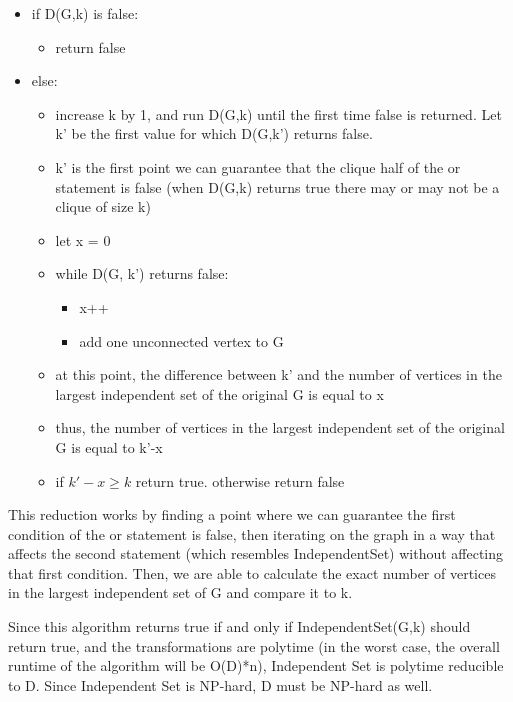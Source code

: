 \documentclass[a4paper]{article}
\begin{document}
\begin{itemize}
    \item if D(G,k) is false:
    \begin{itemize}
        \item return false
    \end{itemize}
    
    \item else:
    \begin{itemize}
        \item increase k by 1, and run D(G,k) until the first time false is returned. Let k' be the first value for which D(G,k') returns false.
        \item k' is the first point we can guarantee that the clique half of the or statement is false (when D(G,k) returns true there may or may not be a clique of size k)
        \item let x = 0
        \item while D(G, k') returns false:
        \begin{itemize}
            \item x++
            \item add one unconnected vertex to G
        \end{itemize}
        \item at this point, the difference between k' and the number of vertices in the largest independent set of the original G is equal to x
        \item thus, the number of vertices in the largest independent set of the original G is equal to k'-x
        \item if $k'-x\geq k$ return true. otherwise return false
    \end{itemize}
\end{itemize}

This reduction works by finding a point where we can guarantee the first condition of the or statement is false, then iterating on the graph in a way that affects the second statement (which resembles IndependentSet) without affecting that first condition. Then, we are able to calculate the exact number of vertices in the largest independent set of G and compare it to k.

Since this algorithm returns true if and only if IndependentSet(G,k) should return true, and the transformations are polytime (in the worst case, the overall runtime of the algorithm will be O(D)*n), Independent Set is polytime reducible to D. Since Independent Set is NP-hard, D must be NP-hard as well.
\end{document}
